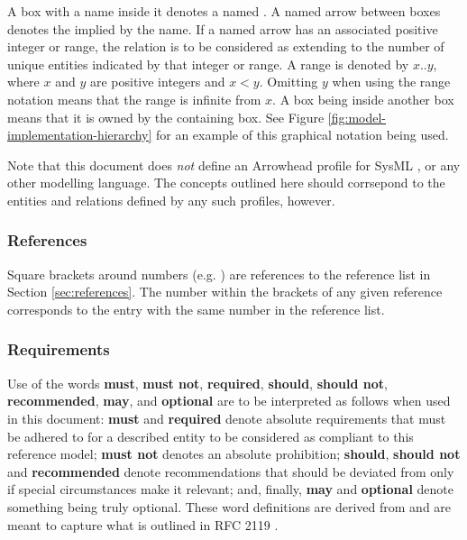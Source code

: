 A box with a name inside it denotes a named .
A named arrow between boxes denotes the  implied by the name.
If a named arrow has an associated positive integer or range, the relation is to be considered as extending to the number of unique entities indicated by that integer or range.
A range is denoted by $x..y$, where $x$ and $y$ are positive integers and $x<y$.
Omitting $y$ when using the range notation means that the range is infinite from $x$.
A box being inside another box means that it is owned by the containing box.
See Figure \ref{fig:model-implementation-hierarchy} for an example of this graphical notation being used.

Note that this document does \textit{not} define an Arrowhead profile for SysML \cite{omg2019sysml}, or any other modelling language.
The concepts outlined here should corrsepond to the entities and relations defined by any such profiles, however.

\subsubsection{References}

Square brackets around numbers (e.g. \cite{delsing2017iot}) are references to the reference list in Section \ref{sec:references}.
The number within the brackets of any given reference corresponds to the entry with the same number in the reference list.

\subsubsection{Requirements}

Use of the words \textbf{must}, \textbf{must not}, \textbf{required}, \textbf{should}, \textbf{should not}, \textbf{recommended}, \textbf{may}, and \textbf{optional} are to be interpreted as follows when used in this document: \textbf{must} and \textbf{required} denote absolute requirements that must be adhered to for a described entity to be considered as compliant to this reference model; \textbf{must not} denotes an absolute prohibition; \textbf{should}, \textbf{should not} and \textbf{recommended} denote recommendations that should be deviated from only if special circumstances make it relevant; and, finally, \textbf{may} and \textbf{optional} denote something being truly optional.
These word definitions are derived from and are meant to capture what is outlined in RFC 2119 \cite{bradner1997keywords}.

